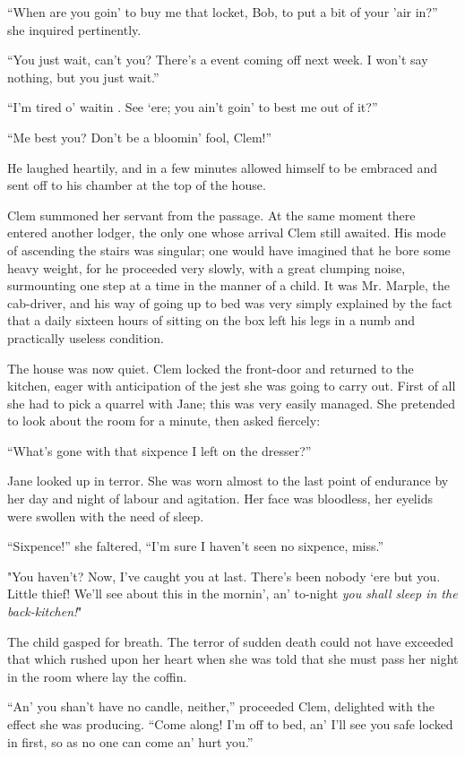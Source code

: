 ``When are you goin' to buy me that locket, Bob, to put a bit of your
'air in?'' she inquired pertinently.

``You just wait, can't you? There's a event coming off next week. I
won't say nothing, but you just wait.''

``I'm tired o' waitin . See `ere; you ain't goin' to best me out of
it?''

``Me best you? Don't be a bloomin' fool, Clem!''

He laughed heartily, and in a few minutes allowed himself to be embraced
and sent off to his chamber at the top of the house.

{\protect\hypertarget{86}{}{}}Clem summoned her servant from the
passage. At the same moment there entered another lodger, the only one
whose arrival Clem still awaited. His mode of ascending the stairs was
singular; one would have imagined that he bore some heavy weight, for he
proceeded very slowly, with a great clumping noise, surmounting one step
at a time in the manner of a child. It was Mr. Marple, the cab-driver,
and his way of going up to bed was very simply explained by the fact
that a daily sixteen hours of sitting on the box left his legs in a numb
and practically useless condition.

The house was now quiet. Clem locked the front-door and returned to the
kitchen, eager with anticipation of the jest she was going to carry out.
First of all she had to pick a quarrel with Jane; this was very easily
managed. She pretended to look about the room for a minute, then asked
fiercely:

``What's gone with that sixpence I left on the dresser?''

Jane looked up in terror. She was worn
{\protect\hypertarget{87}{}{}}almost to the last point of endurance by
her day and night of labour and agitation. Her face was bloodless, her
eyelids were swollen with the need of sleep.

``Sixpence!'' she faltered, ``I'm sure I haven't seen no sixpence,
miss.''

"You haven't? Now, I've caught you at last. There's been nobody `ere but
you. Little thief! We'll see about this in the mornin', an' to-night
\emph{you shall sleep in the back-kitchen!}"

The child gasped for breath. The terror of sudden death could not have
exceeded that which rushed upon her heart when she was told that she
must pass her night in the room where lay the coffin.

``An' you shan't have no candle, neither,'' proceeded Clem, delighted
with the effect she was producing. ``Come along! I'm off to bed, an'
I'll see you safe locked in first, so as no one can come an' hurt you.''

